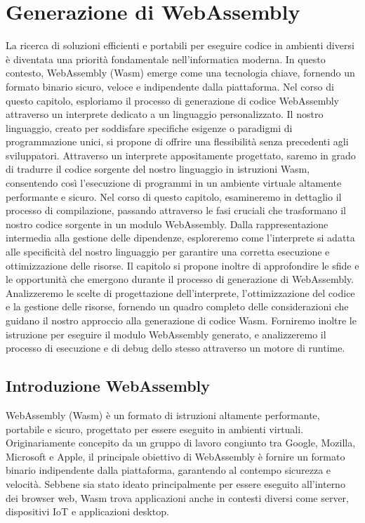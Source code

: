 \documentclass[../../main.tex]{subfiles}
\begin{document}
\chapter{Generazione di WebAssembly}
La ricerca di soluzioni efficienti e portabili per eseguire codice in ambienti diversi è diventata una priorità fondamentale nell'informatica moderna. In questo contesto, WebAssembly (Wasm) emerge come una tecnologia chiave, fornendo un formato binario sicuro, veloce e indipendente dalla piattaforma. Nel corso di questo capitolo, esploriamo il processo di generazione di codice WebAssembly attraverso un interprete dedicato a un linguaggio personalizzato.
Il nostro linguaggio, creato per soddisfare specifiche esigenze o paradigmi di programmazione unici, si propone di offrire una flessibilità senza precedenti agli sviluppatori. Attraverso un interprete appositamente progettato, saremo in grado di tradurre il codice sorgente del nostro linguaggio in istruzioni Wasm, consentendo così l'esecuzione di programmi in un ambiente virtuale altamente performante e sicuro.
Nel corso di questo capitolo, esamineremo in dettaglio il processo di compilazione, passando attraverso le fasi cruciali che trasformano il nostro codice sorgente in un modulo WebAssembly. Dalla rappresentazione intermedia alla gestione delle dipendenze, esploreremo come l'interprete si adatta alle specificità del nostro linguaggio per garantire una corretta esecuzione e ottimizzazione delle risorse.
Il capitolo si propone inoltre di approfondire le sfide e le opportunità che emergono durante il processo di generazione di WebAssembly. Analizzeremo le scelte di progettazione dell'interprete, l'ottimizzazione del codice e la gestione delle risorse, fornendo un quadro completo delle considerazioni che guidano il nostro approccio alla generazione di codice Wasm.
Forniremo inoltre le istruzione per eseguire il modulo WebAssembly generato, e analizzeremo il processo di esecuzione e di debug dello stesso attraverso un motore di runtime.

\section{Introduzione WebAssembly}
WebAssembly (Wasm) è un formato di istruzioni altamente performante, portabile e sicuro, progettato per essere eseguito in ambienti virtuali. Originariamente concepito da un gruppo di lavoro congiunto tra Google, Mozilla, Microsoft e Apple, il principale obiettivo di WebAssembly è fornire un formato binario indipendente dalla piattaforma, garantendo al contempo sicurezza e velocità. Sebbene sia stato ideato principalmente per essere eseguito all'interno dei browser web, Wasm trova applicazioni anche in contesti diversi come server, dispositivi IoT e applicazioni desktop.
\end{document}
